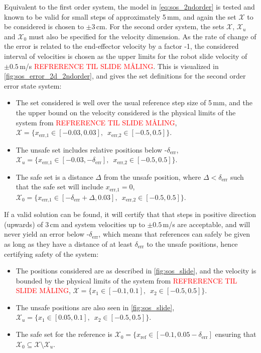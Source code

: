 Equivalent to the first order system, the model in \autoref{eq:sos_2ndorder} is tested and known to be valid for small steps of approximately 5\,mm, and again the set $\mathcal{X}$ to be considered is chosen to $\pm 3$\,cm.
For the second order system, the sets $\mathcal{X}$, $\mathcal{X}_u$ and $\mathcal{X}_0$ must also be specified for the velocity dimension. As the rate of change of the error is related to the end-effector velocity by a factor -1, the considered interval of velocities is chosen as the upper limits for the robot slide velocity of $\pm 0.5$\,m/s \textcolor{red}{REFRERENCE TIL SLIDE M\AA LING}. This is visualized in \autoref{fig:sos_error_2d_2ndorder}, and gives the set definitions for the second order error state system:
\vspace{-2mm}
\begin{itemize}
\itemsep-0.7mm
\item The set considered is well over the usual reference step size of 5\,mm, and the the upper bound on the velocity  considered is the physical limits of the system from \textcolor{red}{REFRERENCE TIL SLIDE M\AA LING}, $\mathcal{X}=\{x_\text{err,1}\in[-0.03,0.03], \,\,\, x_\text{err,2}\in[-0.5,0.5] \}$.
\item The unsafe set includes relative positions below -$\delta_\text{err}$, $\mathcal{X}_u=\{x_\text{err,1}\in[-0.03,-\delta_\text{err}],\,\,\, x_\text{err,2}\in[-0.5,0.5] \}$.
\item The safe set is a distance $\Delta$ from the unsafe position, where $\Delta<\delta_\text{err}$ such that the safe set will include $x_\text{err,1}=0$, $\mathcal{X}_0=\{x_\text{err,1}\in[-\delta_\text{err}+\Delta,0.03], \,\,\, x_\text{err,2}\in[-0.5,0.5] \}$.
\end{itemize}

If a valid solution can be found, it will certify that that steps in positive direction (upwards) of 3\,cm and system velocities up to $\pm 0.5$\,m/s are acceptable, and will never yield an error below -$\delta_\text{err}$, which means that references can safely be given as long as they have a distance of at least $\delta_\text{err}$ to the unsafe positions, hence certifying safety of the system:
\vspace{-2mm}
\begin{itemize}
\itemsep-0.7mm
\item The positions considered are as described in \autoref{fig:sos_slide}, and the velocity is bounded by the physical limits of the system from \textcolor{red}{REFRERENCE TIL SLIDE M\AA LING}, $\mathcal{X}=\{x_1\in[-0.1,0.1],\,\,\, x_2\in[-0.5,0.5] \}$.
\item The unsafe positions are also seen in \autoref{fig:sos_slide}, $\mathcal{X}_u=\{x_1\in[0.05,0.1],\,\,\, x_2\in[-0.5,0.5] \}$.
\item The safe set for the reference is $\mathcal{X}_0=\{x_\text{ref}\in[-0.1,0.05-\delta_\text{err}]$ ensuring that $\mathcal{X}_0\subseteq\mathcal{X}\setminus\mathcal{X}_u$.
\end{itemize}

